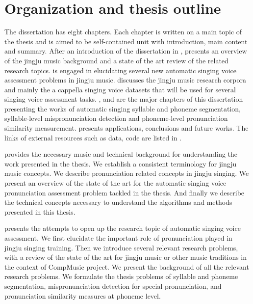 \section{Organization and thesis outline}

The dissertation has eight chapters. Each chapter is written on a main topic of the thesis and is aimed to be self-contained unit with introduction, main content and summary. After an introduction of the dissertation in ,  presents an overview of the jingju music background and a state of the art review of the related research topics.  is engaged in elucidating several new automatic singing voice assessment problems in jingju music.  discusses the jingju music research corpora and mainly the a cappella singing voice datasets that will be used for several singing voice assessment tasks. ,  and  are the major chapters of this dissertation presenting the works of automatic singing syllable and phoneme segmentation, syllable-level mispronunciation detection and phoneme-level pronunciation similarity measurement.  presents applications, conclusions and future works. The links of external resources such as data, code are listed in . 

 provides the necessary music and technical background for understanding the work presented in the thesis. We establish a consistent terminology for jingju music concepts. We describe pronunciation related concepts in jingju singing. We present an overview of the state of the art for the automatic singing voice pronunciation assessment problem tackled in the thesis. And finally we describe the technical concepts necessary to understand the algorithms and methods presented in this thesis.

 presents the attempts to open up the research topic of automatic singing voice assessment. We first elucidate the important role of pronunciation played in jingju singing training. Then we introduce several relevant research problems, with a review of the state of the art for jingju music or other music traditions in the context of CompMusic project. We present the background of all the relevant research problems. We formulate the thesis problems of syllable and phoneme segmentation, mispronunciation detection for special pronunciation, and pronunciation similarity measures at phoneme level.

